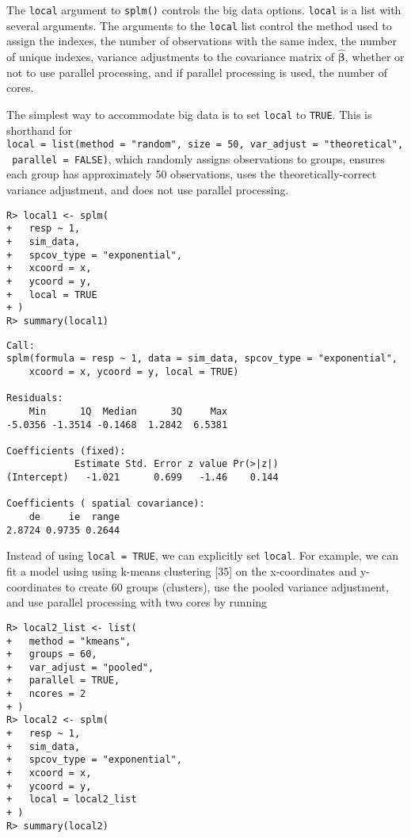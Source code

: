 \documentclass[10pt,letterpaper]{article}
\begin{document}
The \texttt{local} argument to \texttt{splm()} controls the big data
options. \texttt{local} is a list with several arguments. The arguments
to the \texttt{local} list control the method used to assign the
indexes, the number of observations with the same index, the number of
unique indexes, variance adjustments to the covariance matrix of
\(\hat{\boldsymbol{\beta}}\), whether or not to use parallel processing,
and if parallel processing is used, the number of cores.

The simplest way to accommodate big data is to set \texttt{local} to
\texttt{TRUE}. This is shorthand for
\texttt{local\ =\ list(method\ =\ "random",\ size\ =\ 50,\ var\_adjust\ =\ "theoretical",\ parallel\ =\ FALSE)},
which randomly assigns observations to groups, ensures each group has
approximately 50 observations, uses the theoretically-correct variance
adjustment, and does not use parallel processing.

\begin{verbatim}
R> local1 <- splm(
+   resp ~ 1,
+   sim_data,
+   spcov_type = "exponential",
+   xcoord = x,
+   ycoord = y,
+   local = TRUE
+ )
R> summary(local1)
\end{verbatim}

\begin{verbatim}
Call:
splm(formula = resp ~ 1, data = sim_data, spcov_type = "exponential", 
    xcoord = x, ycoord = y, local = TRUE)

Residuals:
    Min      1Q  Median      3Q     Max 
-5.0356 -1.3514 -0.1468  1.2842  6.5381 

Coefficients (fixed):
            Estimate Std. Error z value Pr(>|z|)
(Intercept)   -1.021      0.699   -1.46    0.144

Coefficients ( spatial covariance):
    de     ie  range 
2.8724 0.9735 0.2644 
\end{verbatim}

Instead of using \texttt{local\ =\ TRUE}, we can explicitly set
\texttt{local}. For example, we can fit a model using using k-means
clustering {[}35{]} on the x-coordinates and y-coordinates to create 60
groups (clusters), use the pooled variance adjustment, and use parallel
processing with two cores by running

\begin{verbatim}
R> local2_list <- list(
+   method = "kmeans",
+   groups = 60,
+   var_adjust = "pooled",
+   parallel = TRUE,
+   ncores = 2
+ )
R> local2 <- splm(
+   resp ~ 1,
+   sim_data,
+   spcov_type = "exponential",
+   xcoord = x,
+   ycoord = y,
+   local = local2_list
+ )
R> summary(local2)
\end{verbatim}
\end{document}
